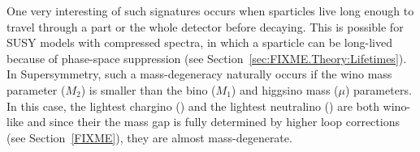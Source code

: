 
One very interesting of such signatures occurs when sparticles live long enough to travel through a part or the whole detector before decaying.
This is possible for SUSY models with compressed spectra, in which a sparticle can be long-lived because of phase-space suppression (see Section~\ref{sec:FIXME.Theory:Lifetimes}).
In Supersymmetry, such a mass-degeneracy naturally occurs if the wino mass parameter ($M_2$) is smaller than the bino ($M_1$) and higgsino mass ($\mu$) parameters.
In this case, the lightest chargino (\chipm) and the lightest neutralino (\chiO) are both wino-like and since their the mass gap is fully determined by higher loop corrections (see Section~\ref{FIXME}), they are almost mass-degenerate.

